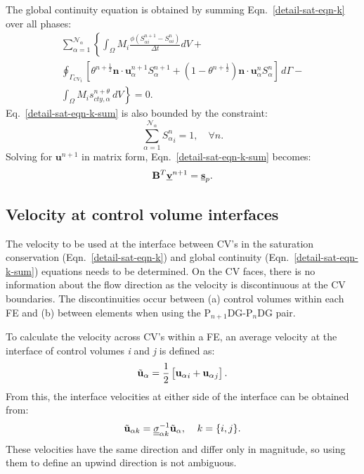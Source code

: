 \documentclass[times]{fldauth}
\begin{document}
The global continuity equation is obtained by summing
Eqn.~\ref{detail-sat-eqn-k} over all phases:
\begin{eqnarray}
  \sum\limits_{\alpha=1}^{\mathcal{N}_{\alpha}} \left\lbrace
  \int_{\Omega} M_{i} \displaystyle\frac{\phi\left({S_{\alpha
        i}^{n+1}}-{S_{\alpha i}^{n}}\right) } {\Delta t} dV +
  \right. \nonumber \\ \left. \displaystyle\oint_{{\Gamma_{CV}}_{i}}
  \left[\theta^{n+\frac{1}{2}} {\mathbf n} \cdot {\mathbf
      u}_{\alpha}^{n+1} S_{\alpha}^{n+1} +
    \left(1-\theta^{n+\frac{1}{2}}\right) {\mathbf n} \cdot {\mathbf
      u}_{\alpha}^{n} S_{\alpha}^{n} \right] \,d\Gamma -
  \right. \nonumber \\ \left. \displaystyle\int_{\Omega} M_{i}
  s_{cty,\alpha}^{n+\theta}\, dV \right\rbrace = 0.
           \label{detail-sat-eqn-k-sum}
\end{eqnarray}
Eq.~\ref{detail-sat-eqn-k-sum} is also bounded by the constraint:
\begin{equation}
  \sum\limits_{\alpha=1}^{\mathcal{N}_{\alpha}} {S_{\alpha}^{n}}_{i} =
  1, \quad \forall n.
\end{equation}
Solving for ${\mathbf u}^{n+1}$ in matrix form,
Eqn.~\ref{detail-sat-eqn-k-sum} becomes:
\begin{equation}
  {\mathbf B}^T \underline{\bf v}^{n+1} = \underline{\bf s}_{p}.
  \label{glob-cty-matrix}
\end{equation}


\subsection{Velocity at control volume interfaces} \label{opt-up} 
The velocity to be used at the interface between CV's in the
saturation conservation (Eqn.~\ref{detail-sat-eqn-k}) and global
continuity (Eqn.~\ref{detail-sat-eqn-k-sum}) equations needs to be
determined. On the CV faces, there is no information about the flow
direction as the velocity is discontinuous at the CV boundaries. The
discontinuities occur between (a) control volumes within each FE and
(b) between elements when using the P$_{n+1}$DG-P$_{n}$DG pair.

To calculate the velocity across CV's within a FE, an average velocity
at the interface of control volumes {\it i} and {\it j} is defined as:
\begin{equation}
  {\tilde{\bf u}}_\alpha = \frac{1}{2} \left[ {{\bf u}_\alpha}_i +
    {{\bf u}_\alpha}_j \right].
\end{equation} 
From this, the interface velocities at either side of the interface
can be obtained from:
\begin{equation}
  {\tilde{\bf u}}_{\alpha k} = \underline{\underline{\sigma}}_{\alpha
    k}^{-1}{\tilde{{\bf u}}}_{\alpha}, \;\;\;\; k=\{i,j\}.
  \label{two-vels}
\end{equation} 
These velocities have the same direction and 
differ only in magnitude, so using them to define an upwind
direction is not ambiguous.
\end{document}
